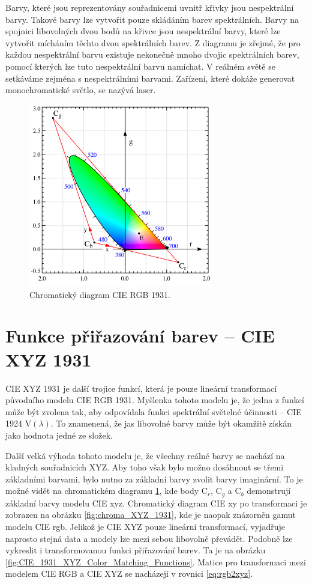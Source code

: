\documentclass[a4paper, 12pt, titlepage]{article}
\begin{document}
  Barvy, které jsou reprezentovány souřadnicemi uvnitř křivky jsou nespektrální barvy.
  Takové barvy lze vytvořit pouze skládáním barev spektrálních.
  Barvy na spojnici libovolných dvou bodů na křivce jsou nespektrální barvy, které lze vytvořit mícháním těchto dvou spektrálních barev.
  Z diagramu je zřejmé, že pro každou nespektrální barvu existuje nekonečně mnoho dvojic spektrálních barev, pomocí kterých lze tuto nespektrální barvu namíchat.
  V reálném světě se setkáváme zejména s nespektrálními barvami.
  Zařízení, které dokáže generovat monochromatické světlo, se nazývá laser. \cite{Abraham2016}

  \begin{figure}[h!]
	\centering
	\includegraphics[width=8cm]{CIE1931_rgxy.png}
	\caption{Chromatický diagram CIE RGB 1931.}
	\label{fig:chroma_RGB_1931}
	\end{figure}

  \section{Funkce přiřazování barev -- CIE XYZ 1931}
  CIE XYZ 1931 je další trojice funkcí, která je pouze lineární transformací původního modelu CIE RGB 1931.
  Myšlenka tohoto modelu je, že jedna z funkcí může být zvolena tak, aby odpovídala funkci spektrální světelné účinnosti -- CIE 1924 V$(\lambda)$.
  To znamenená, že jas libovolné barvy může být okamžitě získán jako hodnota jedné ze složek. \cite{Abraham2016}

  Další velká výhoda tohoto modelu je, že všechny reálné barvy se nachází na kladných souřadnicích XYZ.
  Aby toho však bylo možno dosáhnout se třemi základními barvami, bylo nutno za základní barvy zvolit barvy imaginární.
  To je možné vidět na chromatickém diagramu \ref{fig:chroma_RGB_1931}, kde body C$_r$, C$_g$ a C$_b$ demonstrují základní barvy modelu CIE xyz. Chromatický diagram CIE xy po transformaci je zobrazen na obrázku \ref{fig:chroma_XYZ_1931}, kde je naopak znázorněn gamut modelu CIE rgb.
  Jelikož je CIE XYZ pouze lineární transformací, vyjadřuje naprosto stejná data a modely lze mezi sebou libovolně převádět.
  Podobně lze vykreslit i transformovanou funkci přiřazování barev. Ta je na obrázku \ref{fig:CIE_1931_XYZ_Color_Matching_Functions}. Matice pro transformaci mezi modelem CIE RGB a CIE XYZ se nacházejí v rovnici \ref{eq:rgb2xyz}. \cite{Abraham2016, Walker1996, ciexyz}
\end{document}
